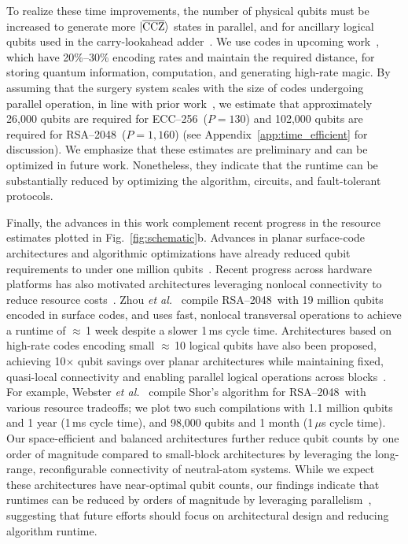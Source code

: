 \documentclass[reprint,twocolumn,secnumarabic,amssymb, aps, prx]{revtex4-2}
\newcommand{\ecc}{\mbox{ECC--256}}
\newcommand{\rsa}{\mbox{RSA--2048}}
\newcommand{\ccz}{\ket{\overline{\text{CCZ}}}}
\begin{document}
To realize these time improvements, the number of physical qubits must be increased to generate more $\ccz$ states in parallel, and for ancillary logical qubits used in the carry-lookahead adder~\cite{draper2004logarithmic}. We use codes in upcoming work~\cite{caltech2026codeatlas}, which have 20\%--30\% encoding rates and maintain the required distance, for storing quantum information, computation, and generating high-rate magic. By assuming that the surgery system scales with the size of codes undergoing parallel operation, in line with prior work~\cite{zheng2025high}, we estimate that approximately 26,000 qubits are required for \ecc\ (\mbox{$P=130$}) and 102,000 qubits are required for \rsa\ (\mbox{$P=1{,}160$}) (see Appendix~\ref{app:time_efficient} for  discussion). We emphasize that these estimates are preliminary and can be  optimized in future work. Nonetheless, they indicate that the runtime can be substantially reduced by optimizing the algorithm, circuits, and fault-tolerant protocols.

Finally, the advances in this work complement recent progress in the resource estimates plotted in Fig.~\ref{fig:schematic}b. Advances in planar surface-code architectures and algorithmic optimizations have already reduced qubit requirements to under one million qubits~\cite{gidney2025factor, babbush2026quantum}. Recent progress across hardware platforms has also motivated architectures leveraging nonlocal connectivity to reduce resource costs~\cite{zhou2025resource, yoder2025tour, webster2026pinnacle}. Zhou \textit{et al.}~\cite{zhou2025resource} compile \rsa\ with 19 million qubits encoded in surface codes, and uses fast, nonlocal transversal operations to achieve a runtime of $\approx$\,1 week despite a slower 1\,ms cycle time. Architectures based on high-rate codes encoding small $\approx$\,10 logical qubits have also been proposed, achieving 10$\times$ qubit savings over planar architectures while maintaining fixed, quasi-local connectivity and enabling parallel logical operations across blocks~\cite{yoder2025tour, webster2026pinnacle}. For example, Webster \textit{et al.}~\cite{webster2026pinnacle} compile Shor's algorithm for \rsa\ with various resource tradeoffs; we plot two such compilations with 1.1 million qubits and 1 year (1\,ms cycle time), and 98,000 qubits and 1 month (1\,$\mu$s cycle time). Our space-efficient and balanced architectures further reduce qubit counts by one order of magnitude compared to small-block architectures by leveraging the long-range, reconfigurable connectivity of neutral-atom systems. While we expect these architectures have near-optimal qubit counts, our findings indicate that runtimes can be reduced by orders of magnitude by leveraging parallelism~\cite{draper2004logarithmic, zhang2025time}, suggesting that future efforts should focus on architectural design and reducing algorithm runtime.
\end{document}
